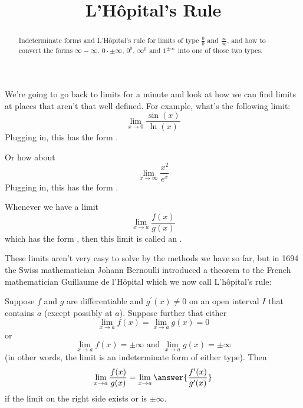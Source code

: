 \documentclass{ximera}
\title{L'Hôpital's Rule}
\begin{document}
\begin{abstract}
Indeterminate forms and L'Hôpital's rule for limits of type $\frac{0}{0}$ and $\frac{\infty}{\infty}$, and how to convert the forms $\infty-\infty$, $0\cdot\pm\infty$, $0^{0}$, $\infty^{0}$ and $1^{\pm\infty}$ into one of those two types.
\end{abstract}
\maketitle

We're going to go back to limits for a minute and look at how we can find limits at places that aren't that well defined. For example, what's the following limit:
\[
\lim _{x \rightarrow 0} \frac{\sin (x)}{\ln (x)}
\]
Plugging in, this has the form .

Or how about
\[
\lim _{x \rightarrow \infty} \frac{x^{2}}{e^{x}}
\]
Plugging in, this has the form .

Whenever we have a limit
\[
\lim _{x \rightarrow a} \frac{f(x)}{g(x)}
\]
which has the form , then this limit is called an .

These limits aren't very easy to solve by the methods we have so far, but in 1694 the Swiss mathematician Johann Bernoulli introduced a theorem to the French mathematician Guillaume de l'Hôpital which we now call L'hôpital's rule:

\begin{theorem}\label{theorem:10-7}
Suppose $f$ and $g$ are differentiable and $g^{\prime}(x) \neq 0$ on an open interval $I$ that contains $a$ (except possibly at $a$). Suppose further that either
\[
\lim _{x \rightarrow a} f(x)=\lim _{x \rightarrow a} g(x)=0
\]
or
\[
\lim _{x \rightarrow a} f(x)= \pm \infty \text { and } \lim _{x \rightarrow a} g(x)= \pm \infty
\]
(in other words, the limit is an indeterminate form of either type). Then
\[
\lim _{x \rightarrow a} \frac{f(x)}{g(x)}=\lim _{x \rightarrow a}\answer{\frac{f^{\prime}(x)}{g^{\prime}(x)}}
\]
if the limit on the right side exists or is $\pm \infty$.
\end{theorem}
\end{document}
